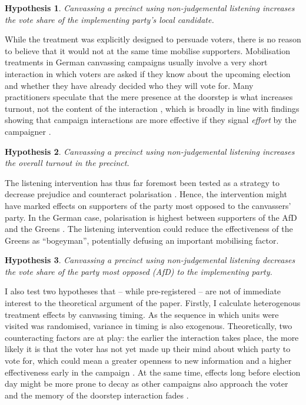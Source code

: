 \documentclass[11pt,a4paper]{scrartcl}
\newtheorem{hyp}{Hypothesis}
\begin{document}
\begin{hyp}\label{h:green_erst}
	Canvassing a precinct using non-judgemental listening increases the vote share of the implementing party's local candidate.
\end{hyp}

While the treatment was explicitly designed to persuade voters, there is no reason to believe that it would not at the same time mobilise supporters. Mobilisation treatments in German canvassing campaigns usually involve a very short interaction in which voters are asked if they know about the upcoming election and whether they have already decided who they will vote for. Many practitioners speculate that the mere presence at the doorstep is what increases turnout, not the content of the interaction \autocites[184]{geisePartizipationDurchDialog2019}, which is broadly in line with findings showing that campaign interactions are more effective if they signal \emph{effort} by the campaigner \autocites{bartonWhatPersuadesVoters2014}{foosParliamentaryCandidatePersuader2018}.

\begin{hyp}\label{h:turnout}
	Canvassing a precinct using non-judgemental listening increases the overall turnout in the precinct.
\end{hyp}

The listening intervention has thus far foremost been tested as a strategy to decrease prejudice and counteract polarisation \autocites[e.g. in]{kallaVoterOutreachCampaigns2022}{broockmanDurablyReducingTransphobia2016}{itzchakovListeningUnderstandRole2024}. Hence, the intervention might have marked effects on supporters of the party most opposed to the canvassers' party. In the German case, polarisation is highest between supporters of the AfD and the Greens \autocite{huddePartisanAffectTimes2022}. The listening intervention could reduce the effectiveness of the Greens as \enquote{bogeyman}, potentially defusing an important mobilising factor.

\begin{hyp}\label{h:afd}
	Canvassing a precinct using non-judgemental listening decreases the vote share of the party most opposed (AfD) to the implementing party.
\end{hyp}

I also test two hypotheses that -- while pre-registered -- are not of immediate interest to the theoretical argument of the paper. Firstly, I calculate heterogenous treatment effects by canvassing timing. As the sequence in which units were visited was randomised, variance in timing is also exogenous. Theoretically, two counteracting factors are at play: the earlier the interaction takes place, the more likely it is that the voter has not yet made up their mind about which party to vote for, which could mean a greater openness to new information and a higher effectiveness early in the campaign \autocite{panagopoulosTimingEverythingPrimacy2011}. At the same time, effects long before election day might be more prone to decay as other campaigns also approach the voter and the memory of the doorstep interaction fades \autocites{nickersonQualityJobOne2007}{kallaMinimalPersuasiveEffects2018}.
\end{document}
